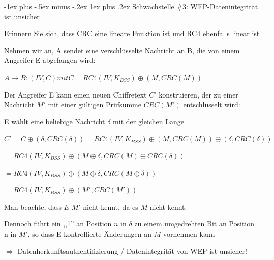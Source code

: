\documentclass[a4paper]{article}
\makeatletter
\renewcommand{\subsubsection}{\@startsection{subsubsection}{3}{0mm}%
 {-1ex plus -.5ex minus -.2ex}%
 {1ex plus .2ex}%
 {\normalfont\small\bfseries}}
\makeatother
\begin{document}
\begin{multicols}{3}
      \subsubsection{Schwachstelle \#3: WEP-Datenintegrität ist unsicher}
      \begin{itemize*}
            \item Erinnern Sie sich, dass CRC eine lineare Funktion ist und RC4 ebenfalls linear ist
            \item Nehmen wir an, A sendet eine verschlüsselte Nachricht an B, die von einem Angreifer E abgefangen wird:
            \begin{itemize*}
                  \item $A \rightarrow B: (IV, C) mit C = RC4(IV, K_{BSS}) \oplus (M, CRC(M))$
            \end{itemize*}
            \item Der Angreifer E kann einen neuen Chiffretext $C'$ konstruieren, der zu einer Nachricht $M'$ mit einer gültigen Prüfsumme $CRC(M')$ entschlüsselt wird:
            \begin{itemize*}
                  \item E wählt eine beliebige Nachricht $\delta$ mit der gleichen Länge
                  \item $C' = C \oplus (\delta, CRC(\delta)) = RC4(IV, K_{BSS}) \oplus (M, CRC(M)) \oplus (\delta, CRC(\delta))$
                  \item $= RC4(IV, K_{BSS}) \oplus (M \oplus \delta, CRC(M) \oplus CRC(\delta))$
                  \item $= RC4(IV, K_{BSS}) \oplus (M \oplus \delta, CRC(M \oplus \delta))$
                  \item $= RC4(IV, K_{BSS}) \oplus (M', CRC(M'))$
                  \item Man beachte, dass $E$ $M'$ nicht kennt, da es $M$ nicht kennt.
                  \item Dennoch führt ein ,,1'' an Position $n$ in $\delta$ zu einem umgedrehten Bit an Position n in $M'$, so dass E kontrollierte Änderungen an $M$ vornehmen kann
                  \item $\Rightarrow$ Datenherkunftsauthentifizierung / Datenintegrität von WEP ist unsicher!
            \end{itemize*}
      \end{itemize*}


\end{multicols}
\end{document}
